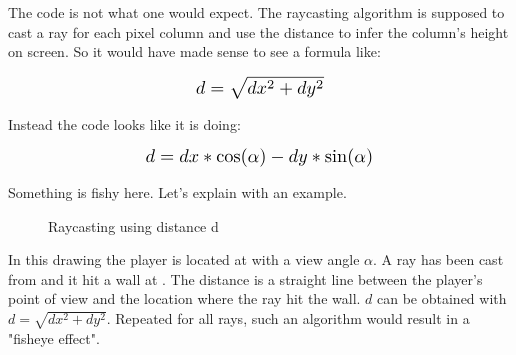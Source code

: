 The code is not what one would expect. The raycasting algorithm is supposed to cast a ray for each pixel column and use the distance  to infer the column's height on screen. So it would have made sense to see a formula like:
\begin{figure}[H]
  \centering
  \begin{equation*}
    \scalebox{1.3}{
$ d = \sqrt{dx^2 + dy^2}$ 
 }
  \end{equation*}
\end{figure}
Instead the code looks like it is doing: 
\begin{figure}[H]
  \centering
  \begin{equation*}
    \scalebox{1.3}{
$d = dx * \cos(\alpha) - dy * \sin(\alpha) $
 }
  \end{equation*}
\end{figure}
Something is fishy here. Let's explain with an example.\\
\par
\begin{figure}[H]
\centering
 
 \caption{Raycasting using distance d} \label{fig:Raycasting2}
\end{figure}

In this drawing the player is located at  with a view angle \begin{math}\alpha\end{math}. A ray has been cast from  and it hit a wall at . The distance  is a straight line between the player's point of view and the location where the ray hit the wall. $d$ can be obtained with $d = \sqrt{dx^2 + dy^2}$. Repeated for all rays, such an algorithm would result in a "fisheye effect".









